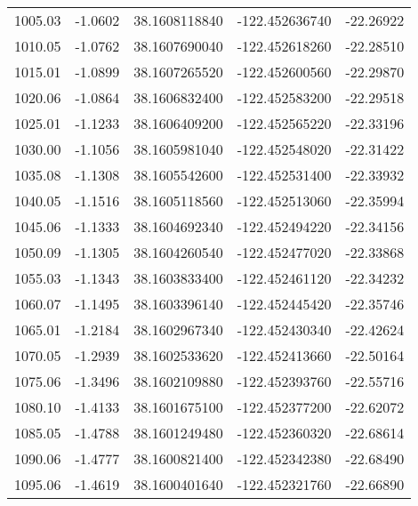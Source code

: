 \begin{scriptsize}
\begin{longtable}{p{2.5cm}p{2.5cm}p{3cm}p{3cm}p{2.5cm}}
          1005.03  & 	-1.0602 &               38.1608118840  &   -122.452636740   &	-22.26922 \\
          1010.05  & 	-1.0762 &               38.1607690040  &   -122.452618260   &	-22.28510 \\
          1015.01  & 	-1.0899 &               38.1607265520  &   -122.452600560   &	-22.29870 \\
          1020.06  & 	-1.0864 &               38.1606832400  &   -122.452583200   &	-22.29518 \\
          1025.01  & 	-1.1233 &               38.1606409200  &   -122.452565220   &	-22.33196 \\
          1030.00  & 	-1.1056 &               38.1605981040  &   -122.452548020   &	-22.31422 \\
          1035.08  & 	-1.1308 &               38.1605542600  &   -122.452531400   &	-22.33932 \\
          1040.05  & 	-1.1516 &               38.1605118560  &   -122.452513060   &	-22.35994 \\
          1045.06  & 	-1.1333 &               38.1604692340  &   -122.452494220   &	-22.34156 \\
          1050.09  & 	-1.1305 &               38.1604260540  &   -122.452477020   &	-22.33868 \\
          1055.03  & 	-1.1343 &               38.1603833400  &   -122.452461120   &	-22.34232 \\
          1060.07  & 	-1.1495 &               38.1603396140  &   -122.452445420   &	-22.35746 \\
          1065.01  & 	-1.2184 &               38.1602967340  &   -122.452430340   &	-22.42624 \\
          1070.05  & 	-1.2939 &               38.1602533620  &   -122.452413660   &	-22.50164 \\
          1075.06  & 	-1.3496 &               38.1602109880  &   -122.452393760   &	-22.55716 \\
          1080.10  & 	-1.4133 &               38.1601675100  &   -122.452377200   &	-22.62072 \\
          1085.05  & 	-1.4788 &               38.1601249480  &   -122.452360320   &	-22.68614 \\
          1090.06  & 	-1.4777 &               38.1600821400  &   -122.452342380   &	-22.68490 \\
          1095.06  & 	-1.4619 &               38.1600401640  &   -122.452321760   &	-22.66890 \\

\end{longtable}
\end{scriptsize}
